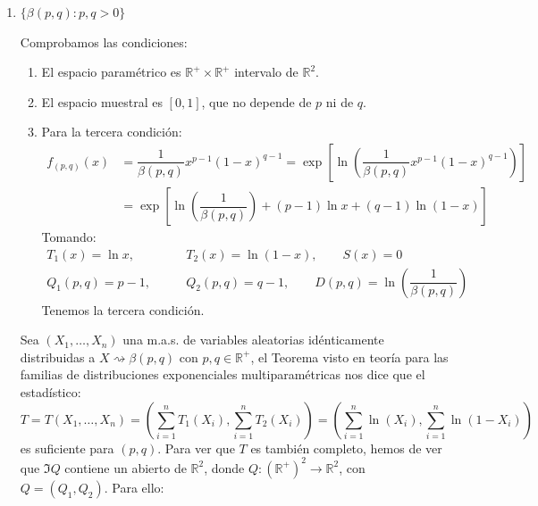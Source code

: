 \begin{ejercicio}
\begin{enumerate}[label=\alph*)]
            Además, puesto que la suma de logaritmos es el logaritmo del producto y la exponencial es una función biyectiva, podemos tomar como estadístico suficiente y completo:
            \begin{equation*}
                T(X_1, \ldots, X_n) = \left(\prod_{i=1}^n X_i, \sum_{i=1}^n X_i\right)
            \end{equation*}
        \item $\{\beta(p,q) : p,q>0\}$

            Comprobamos las condiciones:
            \begin{enumerate}[label=\arabic*.]
                \item El espacio paramétrico es $\mathbb{R}^+\times \mathbb{R}^+$ intervalo de $\mathbb{R}^2$.
                \item El espacio muestral es $[0,1]$, que no depende de $p$ ni de $q$.
                \item Para la tercera condición:
                    \begin{align*}
                        f_{(p,q)}(x) &= \dfrac{1}{\beta(p,q)}x^{p-1}{(1-x)}^{q-1} = \exp\left[\ln\left(\dfrac{1}{\beta(p,q)}x^{p-1}{(1-x)}^{q-1} \right)\right] \\
                                     &= \exp\left[\ln\left(\dfrac{1}{\beta(p,q)}\right) + (p-1)\ln x + (q-1)\ln(1-x)\right]
                    \end{align*}
                Tomando:
                \begin{align*}
                    T_1(x) = \ln x, &\qquad T_2(x) = \ln(1-x), \qquad S(x) = 0 \\
                    Q_1(p,q) = p-1, &\qquad Q_2(p,q) = q-1, \qquad D(p,q) = \ln\left(\dfrac{1}{\beta(p,q)}\right) 
                \end{align*}
                Tenemos la tercera condición.
            \end{enumerate}
            Sea $(X_1, \ldots, X_n)$ una m.a.s. de variables aleatorias idénticamente distribuidas a $X\rightsquigarrow \beta(p,q)$ con $p,q\in \mathbb{R}^+$, el Teorema visto en teoría para las familias de distribuciones exponenciales multiparamétricas nos dice que el estadístico:
            \begin{equation*}
                T = T(X_1, \ldots, X_n) = \left(\sum_{i=1}^{n}T_1(X_i), \sum_{i=1}^{n}T_2(X_i)\right) = \left(\sum_{i=1}^{n}\ln(X_i), \sum_{i=1}^{n}\ln(1-X_i)\right)
            \end{equation*}
            es suficiente para $(p,q)$. Para ver que $T$ es también completo, hemos de ver que $\Im Q$ contiene un abierto de $\mathbb{R}^2$, donde $Q:{(\mathbb{R}^+)}^{2}\to \mathbb{R}^2$, con $Q=(Q_1,Q_2)$. Para ello:

\end{enumerate}
\end{ejercicio}
